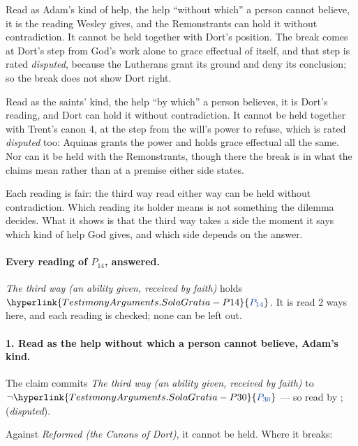 \documentclass[11pt]{article}
\newcommand{\pvar}[2]{\hyperlink{#1-P#2}{\textcolor{claimlink}{P_{#2}}}}
\begin{document}
Read as Adam’s kind of help, the help “without which” a person cannot believe, it is the reading Wesley gives, and the Remonstrants can hold it without contradiction. It cannot be held together with Dort’s position. The break comes at Dort’s step from God’s work alone to grace effectual of itself, and that step is rated \emph{disputed}, because the Lutherans grant its ground and deny its conclusion; so the break does not show Dort right.

Read as the saints’ kind, the help “by which” a person believes, it is Dort’s reading, and Dort can hold it without contradiction. It cannot be held together with Trent’s canon 4, at the step from the will’s power to refuse, which is rated \emph{disputed} too: Aquinas grants the power and holds grace effectual all the same. Nor can it be held with the Remonstrants, though there the break is in what the claims mean rather than at a premise either side states.

Each reading is fair: the third way read either way can be held without contradiction. Which reading its holder means is not something the dilemma decides. What it shows is that the third way takes a side the moment it says which kind of help God gives, and which side depends on the answer.

\paragraph{Every reading of \(P_{14}\), answered.} \emph{The third way (an ability given, received by faith)} holds \(\pvar{TestimonyArguments.SolaGratia}{14}\). It is read 2 ways here, and each reading is checked; none can be left out.

\paragraph{1. Read as the help without which a person cannot believe, Adam’s kind.} The claim commits \emph{The third way (an ability given, received by faith)} to \(\lnot \pvar{TestimonyArguments.SolaGratia}{30}\) --- so read by \cite[397]{wesley-works-9-1827}; \cite[485]{npnf1-05-1887} (\emph{disputed}).

Against \emph{Reformed (the Canons of Dort)}, it cannot be held. Where it breaks:
\end{document}
